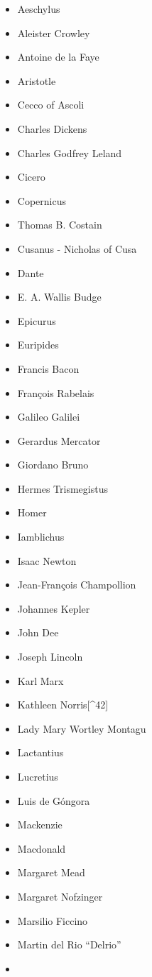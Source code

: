 \documentclass[12pt]{article}
\providecommand{\tightlist}{%
  \setlength{\itemsep}{0pt}\setlength{\parskip}{0pt}}
\begin{document}
\begin{itemize}
\tightlist
\item
  Aeschylus
\item
  Aleister Crowley
\item
  Antoine de la Faye
\item
  Aristotle
\item
  Cecco of Ascoli
\item
  Charles Dickens
\item
  Charles Godfrey Leland
\item
  Cicero
\item
  Copernicus
\item
  Thomas B. Costain
\item
  Cusanus - Nicholas of Cusa
\item
  Dante
\item
  E. A. Wallis Budge
\item
  Epicurus
\item
  Euripides
\item
  Francis Bacon
\item
  François Rabelais
\item
  Galileo Galilei
\item
  Gerardus Mercator
\item
  Giordano Bruno
\item
  Hermes Trismegistus
\item
  Homer
\item
  Iamblichus
\item
  Isaac Newton
\item
  Jean-François Champollion
\item
  Johannes Kepler
\item
  John Dee
\item
  Joseph Lincoln
\item
  Karl Marx
\item
  Kathleen Norris{[}\^{}42{]}
\item
  Lady Mary Wortley Montagu
\item
  Lactantius
\item
  Lucretius
\item
  Luis de Góngora
\item
  Mackenzie
\item
  Macdonald
\item
  Margaret Mead
\item
  Margaret Nofzinger
\item
  Marsilio Ficcino
\item
  Martin del Rio ``Delrio''
\item

\end{itemize}
\end{document}
